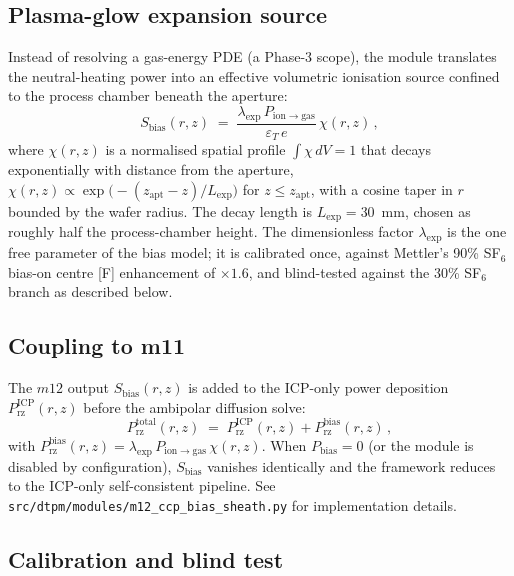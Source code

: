 \subsection*{Plasma-glow expansion source}

Instead of resolving a gas-energy PDE (a Phase-3 scope), the module
translates the neutral-heating power into an effective volumetric
ionisation source confined to the process chamber beneath the aperture:
\begin{equation}
  S_\mathrm{bias}(r,z) \;=\; \frac{\lambda_\mathrm{exp}\,P_\mathrm{ion\to gas}}{\varepsilon_T\,e}\,\chi(r,z)\,,
  \label{eq:Sbias}
\end{equation}
where $\chi(r,z)$ is a normalised spatial profile $\int\chi\,dV=1$ that
decays exponentially with distance from the aperture,
$\chi(r,z) \propto \exp\!\bigl(-(z_\mathrm{apt}-z)/L_\mathrm{exp}\bigr)$
for $z \le z_\mathrm{apt}$, with a cosine taper in $r$ bounded by the
wafer radius.  The decay length is $L_\mathrm{exp} = 30$~mm, chosen as
roughly half the process-chamber height.  The dimensionless factor
$\lambda_\mathrm{exp}$ is the one free parameter of the bias model; it
is calibrated once, against Mettler's 90\% SF$_6$ bias-on centre [F]
enhancement of $\times 1.6$, and blind-tested against the 30\% SF$_6$
branch as described below.

\subsection*{Coupling to m11}

The $m12$ output $S_\mathrm{bias}(r,z)$ is added to the ICP-only power
deposition $P_\mathrm{rz}^\mathrm{ICP}(r,z)$ before the ambipolar
diffusion solve:
\begin{equation}
  P_\mathrm{rz}^\mathrm{total}(r,z) \;=\; P_\mathrm{rz}^\mathrm{ICP}(r,z) + P_\mathrm{rz}^\mathrm{bias}(r,z)\,,
\end{equation}
with
$P_\mathrm{rz}^\mathrm{bias}(r,z) = \lambda_\mathrm{exp}\,P_\mathrm{ion\to gas}\,\chi(r,z)$.
When $P_\mathrm{bias} = 0$ (or the module is disabled by configuration),
$S_\mathrm{bias}$ vanishes identically and the framework reduces to the
ICP-only self-consistent pipeline.  See
\texttt{src/dtpm/modules/m12\_ccp\_bias\_sheath.py} for implementation
details.

\subsection*{Calibration and blind test}

